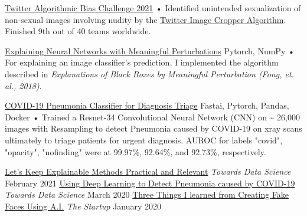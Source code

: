 \documentclass[]{awesome-cv}
\begin{document}
\vspace{-10mm}
\begin{cventries}
	\cventry
	{}
	{\href{https://github.com/ajsanjoaquin/twitter-bias-challenge}{Twitter Algorithmic Bias Challenge 2021}}
	{}
	{}
	{• Identified unintended sexualization of non-sexual images involving nudity by the \href{https://github.com/twitter-research/image-crop-analysis}{Twitter Image Cropper Algorithm}. Finished 9th out of 40 teams worldwide.}
	
	\vspace{-1mm}
	\cventry
	{}
	{\href{https://github.com/ajsanjoaquin/mPerturb}{Explaining Neural Networks with Meaningful Perturbations}}
	{Pytorch, NumPy}
	{}
	{• For explaining an image classifier's prediction, I implemented the algorithm described in \textit{Explanations of Black Boxes by Meaningful Perturbation (Fong, et. al., 2018)}.}
	
	\vspace{-1mm}
	\cventry
	{}
	{\href{https://github.com/ajsanjoaquin/COVID-19-Scanner}{COVID-19 Pneumonia Classifier for Diagnosis Triage}}
	{Fastai, Pytorch, Pandas, Docker}
	{}
	{• Trained a Resnet-34 Convolutional Neural Network (CNN) on \textasciitilde{} 26,000 images with Resampling to detect Pneumonia caused by COVID-19 on xray scans ultimately to triage patients for urgent diagnosis. AUROC for labels "covid", "opacity", "nofinding" were at 99.97\%, 92.64\%, and 92.73\%, respectively.}

	
	\vspace{-4mm}
\end{cventries}
\begin{cvhonors}
	\cvhonor
	{\href{https://towardsdatascience.com/lets-keep-explainable-methods-practical-and-relevant-92e963ce3f64}{Let’s Keep Explainable Methods Practical and Relevant}}
	{\textit{Towards Data Science}}
	{}
	{February 2021}
	\cvhonor
	{\href{https://towardsdatascience.com/using-deep-learning-to-detect-ncov-19-from-x-ray-images-1a89701d1acd}{Using Deep Learning to Detect Pneumonia caused by COVID-19}}
	{\textit{Towards Data Science}}
	{}
	{March 2020}
	\cvhonor
	{\href{https://medium.com/swlh/three-things-i-learned-from-creating-fake-faces-using-ai-fc4c95282a37}{Three Things I learned from Creating Fake Faces Using A.I.}}
	{\textit{The Startup}}
	{}
	{January 2020}
\end{cvhonors}
\vspace{-20mm}
\ 
\end{document}
